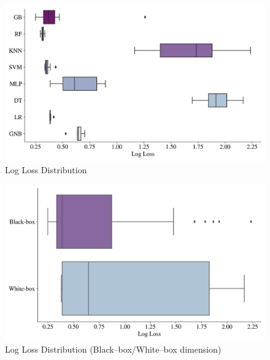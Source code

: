 \begin{figure}[H]
    \centering
    \caption{Log Loss Distribution}\vspace{0.5em}
    \label{fig:loglossdist}
    \includegraphics[width=140mm]{Figures/LOG LOSS_Distribution.jpg}
    
    \vspace{-1em}
\end{figure}

\begin{figure}[H]
    \centering
    \caption{Log Loss Distribution (Black--box/White--box dimension)}\vspace{0.5em}
    \label{fig:loglossdistbbwb}
    \includegraphics[width=140mm]{Figures/LOG LOSS_Distribution_BB_WB.jpg}
    
    \vspace{-1em}
\end{figure}

